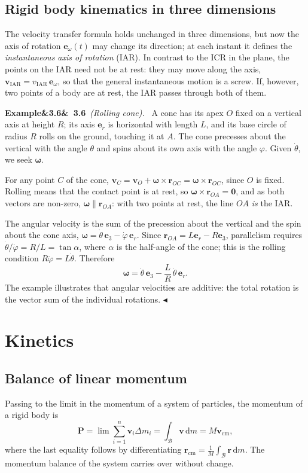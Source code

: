 \documentclass[11pt,a4paper,oneside]{report}
\numberwithin{equation}{chapter}
\newcommand{\vect}[1]{\bm{#1}}
\newcommand{\e}[1]{\vect{e}_{#1}}
\newcommand{\dd}{\,\mathrm{d}}
\newcommand{\cm}{\mathrm{cm}}
\theoremstyle{plain}
\theoremstyle{definition}
\theoremstyle{remark}
\newenvironment{example}[2]{%
  \par\addvspace{\bigskipamount}\noindent
  \textbf{Example\ifx&#1&\else~#1\fi}\ \textit{(#2).}\ \ignorespaces}%
  {\hfill$\blacktriangleleft$\par\addvspace{\bigskipamount}}
\begin{document}
\subsection{Rigid body kinematics in three dimensions}
The velocity transfer formula holds unchanged in three dimensions, but now the axis of rotation $\e\omega(t)$ may
change its direction; at each instant it defines the \emph{instantaneous axis of rotation} (IAR). In contrast to the
ICR in the plane, the points on the IAR need not be at rest: they may move along the axis,
$\vect v_{\text{IAR}}=v_{\text{IAR}}\,\e\omega$, so that the general instantaneous motion is a screw. If, however, two points
of a body are at rest, the IAR passes through both of them.

\begin{example}{3.6}{Rolling cone}
A cone has its apex $O$ fixed on a vertical axis at height $R$; its axis $\e r$ is horizontal with length $L$, and its base
circle of radius $R$ rolls on the ground, touching it at $A$. The cone precesses about the vertical with the angle
$\theta$ and spins about its own axis with the angle $\varphi$. Given $\dot\theta$, we seek $\vect\omega$.

For any point $C$ of the cone, $\vect v_C=\vect v_O+\vect\omega\times\vect r_{OC}=\vect\omega\times\vect r_{OC}$, since
$O$ is fixed. Rolling means that the contact point is at rest, so $\vect\omega\times\vect r_{OA}=\vect 0$, and as both
vectors are non-zero, $\vect\omega\parallel\vect r_{OA}$: with two points at rest, the line $OA$ \emph{is} the IAR.

The angular velocity is the sum of the precession about the vertical and the spin about the cone axis,
$\vect\omega=\dot\theta\,\e3-\dot\varphi\,\e r$. Since $\vect r_{OA}=L\e r-R\e3$, parallelism requires
$\dot\theta/\dot\varphi=R/L=\tan\alpha$, where $\alpha$ is the half-angle of the cone; this is the rolling condition
$R\dot\varphi=L\dot\theta$. Therefore
\[
  \vect\omega=\dot\theta\,\e3-\frac LR\,\dot\theta\,\e r .
\]
The example illustrates that angular velocities are additive: the total rotation is the vector sum of the individual
rotations.
\end{example}

\section{Kinetics}

\subsection{Balance of linear momentum}
Passing to the limit in the momentum of a system of particles, the momentum of a rigid body is
\[
  \vect P=\lim\sum_{i=1}^n\vect v_i\Delta m_i=\int_{\mathcal B}\vect v\dd m=M\vect v_\cm ,
\]
where the last equality follows by differentiating $\vect r_\cm=\frac1M\int_{\mathcal B}\vect r\dd m$. The momentum
balance of the system carries over without change.
\end{document}

